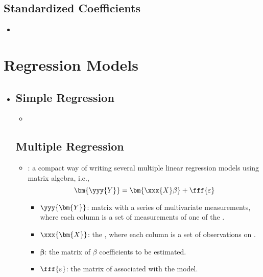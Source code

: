 \begin{itemize}
\begin{itemize}
\begin{itemize}
    \end{itemize}
  \end{itemize}

  \subsection{Standardized Coefficients}
  \begin{itemize}
    \item 
  \end{itemize}
  
\end{itemize}

\section{Regression Models}
\begin{itemize}
  \item [] 
  
  \subsection{Simple Regression}
  \begin{itemize}
    \item 
  \end{itemize}
  
  \subsection{Multiple Regression}
  \begin{itemize}
    \item {}: a compact way of writing several multiple linear regression models using matrix algebra, i.e.,
    \[%
    \bm{\yyy{Y}} = \bm{\xxx{X}\beta} + \fff{\varepsilon}
    \]%
    \begin{itemize}
      \item \(\yyy{\bm{Y}}\): matrix with a series of multivariate measurements, where each column is a set of measurements of one of the .
      \item \(\xxx{\bm{X}}\): the , where each column is a set of observations on .
      \item \(\bm{\beta}\): the matrix of \(\beta \) coefficients to be estimated.
      \item \(\displaystyle\fff{\varepsilon}\): the matrix of  associated with the model.
    \end{itemize}
  \end{itemize}
  

\end{itemize}
